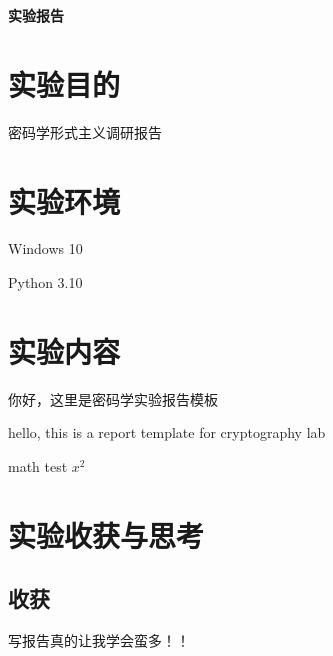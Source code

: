 \documentclass[UTF8]{ctexart}
\begin{document}


\begin{center}
    {\sourcehan\Huge\textbf{实验报告}}
\end{center}


\section{实验目的}
密码学形式主义调研报告


\section{实验环境}

Windows 10
\par
Python 3.10


\section{实验内容}
你好，这里是密码学实验报告模板

hello, this is a report template for cryptography lab

math test $x^2$


 

\clearpage
\section{实验收获与思考}
\subsection{收获}
写报告真的让我学会蛮多！！


\end{document}
